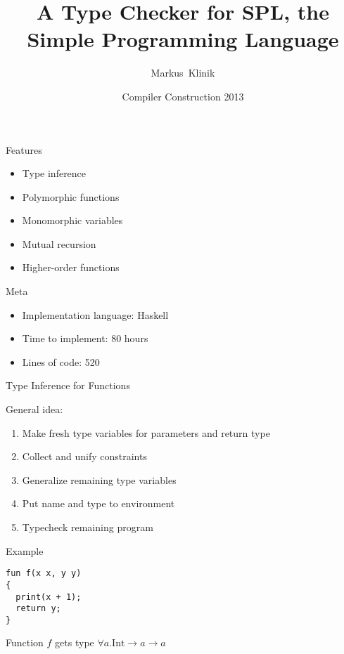\documentclass{beamer}
\title
{A Type Checker for SPL, the Simple Programming Language}
\author
{Markus~Klinik}
\institute[Radboud University Nijmegen]
{
  Radboud University Nijmegen
}
\date
{Compiler Construction 2013}
\newcommand{\arr}{\rightarrow}
\begin{document}
\begin{frame}
  \titlepage
\end{frame}

\begin{frame}{Features}

  \begin{itemize}
    \item Type inference
    \item Polymorphic functions
    \item Monomorphic variables
    \item Mutual recursion
    \item Higher-order functions
  \end{itemize}

\end{frame}

\begin{frame}{Meta}

  \begin{itemize}
    \item Implementation language: Haskell
    \item Time to implement: 80 hours
    \item Lines of code: 520
  \end{itemize}

\end{frame}


\begin{frame}{Type Inference for Functions}

General idea:

  \begin{enumerate}
    \item Make fresh type variables for parameters and return type
    \item Collect and unify constraints
    \item Generalize remaining type variables
    \item Put name and type to environment
    \item Typecheck remaining program
  \end{enumerate}

\end{frame}


\begin{frame}[fragile]{Example}

\begin{verbatim}
fun f(x x, y y)
{
  print(x + 1);
  return y;
}
\end{verbatim}

Function $f$ gets type $\forall a . \text{Int} \arr a \arr a$

\end{frame}
\end{document}
